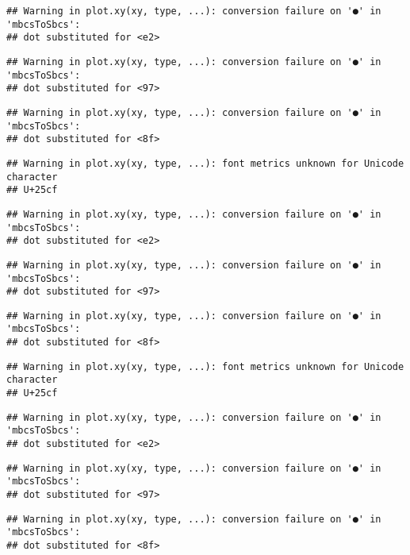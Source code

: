 \documentclass[
]{article}
\begin{document}
\begin{verbatim}
## Warning in plot.xy(xy, type, ...): conversion failure on '●' in 'mbcsToSbcs':
## dot substituted for <e2>
\end{verbatim}

\begin{verbatim}
## Warning in plot.xy(xy, type, ...): conversion failure on '●' in 'mbcsToSbcs':
## dot substituted for <97>
\end{verbatim}

\begin{verbatim}
## Warning in plot.xy(xy, type, ...): conversion failure on '●' in 'mbcsToSbcs':
## dot substituted for <8f>
\end{verbatim}

\begin{verbatim}
## Warning in plot.xy(xy, type, ...): font metrics unknown for Unicode character
## U+25cf
\end{verbatim}

\begin{verbatim}
## Warning in plot.xy(xy, type, ...): conversion failure on '●' in 'mbcsToSbcs':
## dot substituted for <e2>
\end{verbatim}

\begin{verbatim}
## Warning in plot.xy(xy, type, ...): conversion failure on '●' in 'mbcsToSbcs':
## dot substituted for <97>
\end{verbatim}

\begin{verbatim}
## Warning in plot.xy(xy, type, ...): conversion failure on '●' in 'mbcsToSbcs':
## dot substituted for <8f>
\end{verbatim}

\begin{verbatim}
## Warning in plot.xy(xy, type, ...): font metrics unknown for Unicode character
## U+25cf
\end{verbatim}

\begin{verbatim}
## Warning in plot.xy(xy, type, ...): conversion failure on '●' in 'mbcsToSbcs':
## dot substituted for <e2>
\end{verbatim}

\begin{verbatim}
## Warning in plot.xy(xy, type, ...): conversion failure on '●' in 'mbcsToSbcs':
## dot substituted for <97>
\end{verbatim}

\begin{verbatim}
## Warning in plot.xy(xy, type, ...): conversion failure on '●' in 'mbcsToSbcs':
## dot substituted for <8f>
\end{verbatim}
\end{document}
